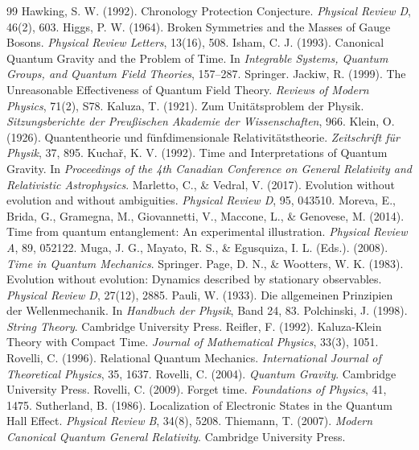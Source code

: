 \documentclass[11pt,a4paper]{article}
\begin{document}
\begin{thebibliography}{99}
Hawking, S. W. (1992). Chronology Protection Conjecture. \emph{Physical Review D}, 46(2), 603.
Higgs, P. W. (1964). Broken Symmetries and the Masses of Gauge Bosons. \emph{Physical Review Letters}, 13(16), 508.
Isham, C. J. (1993). Canonical Quantum Gravity and the Problem of Time. In \emph{Integrable Systems, Quantum Groups, and Quantum Field Theories}, 157--287. Springer.
Jackiw, R. (1999). The Unreasonable Effectiveness of Quantum Field Theory. \emph{Reviews of Modern Physics}, 71(2), S78.
Kaluza, T. (1921). Zum Unitätsproblem der Physik. \emph{Sitzungsberichte der Preußischen Akademie der Wissenschaften}, 966.
Klein, O. (1926). Quantentheorie und fünfdimensionale Relativitätstheorie. \emph{Zeitschrift für Physik}, 37, 895.
Kuchař, K. V. (1992). Time and Interpretations of Quantum Gravity. In \emph{Proceedings of the 4th Canadian Conference on General Relativity and Relativistic Astrophysics}.
Marletto, C., \& Vedral, V. (2017). Evolution without evolution and without ambiguities. \emph{Physical Review D}, 95, 043510.
Moreva, E., Brida, G., Gramegna, M., Giovannetti, V., Maccone, L., \& Genovese, M. (2014). Time from quantum entanglement: An experimental illustration. \emph{Physical Review A}, 89, 052122.
Muga, J. G., Mayato, R. S., \& Egusquiza, I. L. (Eds.). (2008). \emph{Time in Quantum Mechanics}. Springer.
Page, D. N., \& Wootters, W. K. (1983). Evolution without evolution: Dynamics described by stationary observables. \emph{Physical Review D}, 27(12), 2885.
Pauli, W. (1933). Die allgemeinen Prinzipien der Wellenmechanik. In \emph{Handbuch der Physik}, Band 24, 83.
Polchinski, J. (1998). \emph{String Theory}. Cambridge University Press.
Reifler, F. (1992). Kaluza-Klein Theory with Compact Time. \emph{Journal of Mathematical Physics}, 33(3), 1051.
Rovelli, C. (1996). Relational Quantum Mechanics. \emph{International Journal of Theoretical Physics}, 35, 1637.
Rovelli, C. (2004). \emph{Quantum Gravity}. Cambridge University Press.
Rovelli, C. (2009). Forget time. \emph{Foundations of Physics}, 41, 1475.
Sutherland, B. (1986). Localization of Electronic States in the Quantum Hall Effect. \emph{Physical Review B}, 34(8), 5208.
Thiemann, T. (2007). \emph{Modern Canonical Quantum General Relativity}. Cambridge University Press.

\end{thebibliography}
\end{document}
